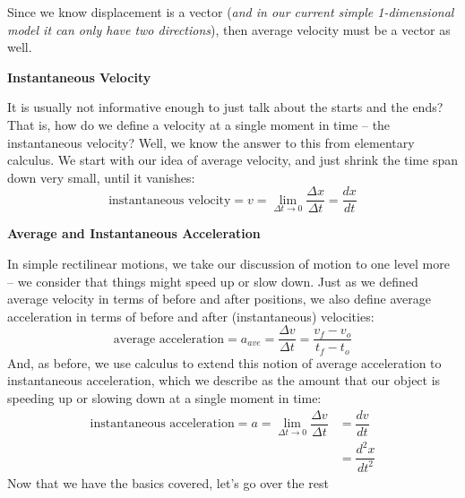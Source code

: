 \documentclass[12pt,addpoints]{exam}
\begin{document}
	Since we know displacement is a vector (\textit{and in our current simple 1-dimensional model it can only have two directions}), then average velocity must be a vector as well.
	\begin{center}
		\textbf{Instantaneous Velocity}
	\end{center}
	It is usually not informative enough to just talk about the starts and the ends? That is, how do we define a velocity at a single moment in time – the instantaneous velocity? Well, we know the answer to this from elementary calculus. We start with our idea of average velocity, and just shrink the time span down very small, until it vanishes:
	$$\text{instantaneous velocity} = v = \lim_{\Delta t \rightarrow 0} \dfrac{\Delta x}{\Delta t} = \dfrac{dx}{dt}$$
	\begin{center}
		\textbf{Average and Instantaneous Acceleration}
	\end{center}
	In simple rectilinear motions, we take our discussion of motion to one level more – we consider that things might speed up or slow down. Just as we defined average velocity in terms of before and after positions, we also define average acceleration in terms of before and after (instantaneous) velocities:
	$$\text{average acceleration} = a_{ave} = \dfrac{\Delta v}{\Delta t} = \dfrac{v_f-v_o}{t_f-t_o}$$
	And, as before, we use calculus to extend this notion of average acceleration to instantaneous acceleration, which we describe as the amount that our object is speeding up or slowing down at a single moment in time:
	\begin{align} \text{instantaneous acceleration} = a = \lim_{\Delta t \rightarrow 0} \dfrac{\Delta v}{\Delta t} &= \dfrac{dv}{dt} \\[5pt] &= \dfrac{d^2x}{dt^2}\end{align}
	Now that we have the basics covered, let's go over the rest
	
	
\end{document}
